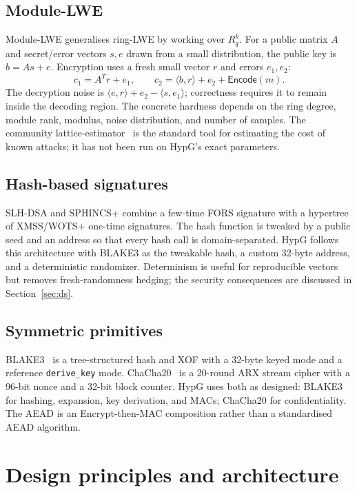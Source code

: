 \documentclass[runningheads]{llncs}
\newcommand{\Encode}{\mathsf{Encode}}
\begin{document}
\subsection{Module-LWE}

Module-LWE generalises ring-LWE by working over $R_q^k$.  For a public
matrix $A$ and secret/error vectors $s,e$ drawn from a small
distribution, the public key is $b=A s+e$.  Encryption uses a fresh
small vector $r$ and errors $e_1,e_2$:
\[
  c_1 = A^{T}r+e_1, \qquad
  c_2 = \langle b,r\rangle + e_2 + \Encode(m).
\]
The decryption noise is $\langle e,r\rangle+e_2-\langle s,e_1\rangle$;
correctness requires it to remain inside the decoding region.  The
concrete hardness depends on the ring degree, module rank, modulus,
noise distribution, and number of samples.  The community
lattice-estimator~\cite{estimator} is the standard tool for estimating
the cost of known attacks; it has not been run on HypG's exact
parameters.

\subsection{Hash-based signatures}

SLH-DSA and SPHINCS+ combine a few-time FORS signature with a hypertree
of XMSS/WOTS+ one-time signatures.  The hash function is tweaked by a
public seed and an address so that every hash call is
domain-separated.  HypG follows this architecture with BLAKE3 as the
tweakable hash, a custom 32-byte address, and a deterministic
randomizer.  Determinism is useful for reproducible vectors but removes
fresh-randomness hedging; the security consequences are discussed in
Section~\ref{sec:ds}.

\subsection{Symmetric primitives}

BLAKE3~\cite{blake3} is a tree-structured hash and XOF with a
32-byte keyed mode and a reference \texttt{derive\_key} mode.
ChaCha20~\cite{rfc8439} is a 20-round ARX stream cipher with a 96-bit
nonce and a 32-bit block counter.  HypG uses both as designed: BLAKE3
for hashing, expansion, key derivation, and MACs; ChaCha20 for
confidentiality.  The AEAD is an Encrypt-then-MAC composition rather
than a standardised AEAD algorithm.

\section{Design principles and architecture}
\label{sec:principles}
\end{document}
